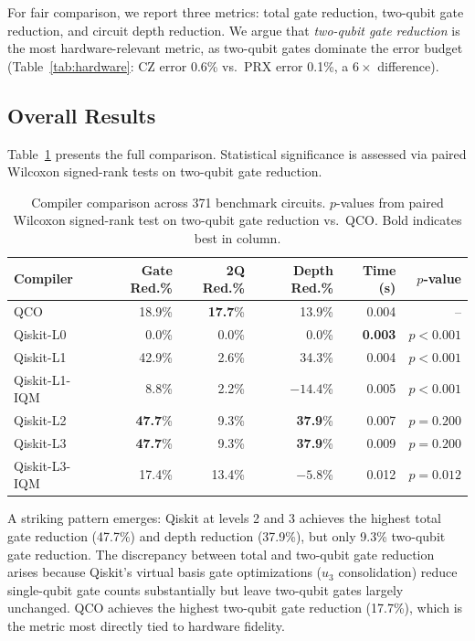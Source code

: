 \documentclass[sigconf,nonacm]{acmart}
\begin{document}
For fair comparison, we report three metrics: total gate reduction, two-qubit gate reduction, and circuit depth reduction. We argue that \emph{two-qubit gate reduction} is the most hardware-relevant metric, as two-qubit gates dominate the error budget (Table~\ref{tab:hardware}: CZ error 0.6\% vs.\ PRX error 0.1\%, a $6\times$ difference).

\subsection{Overall Results}

Table~\ref{tab:compiler} presents the full comparison. Statistical significance is assessed via paired Wilcoxon signed-rank tests on two-qubit gate reduction.

\begin{table}[t]
\centering
\caption{Compiler comparison across 371 benchmark circuits. $p$-values from paired Wilcoxon signed-rank test on two-qubit gate reduction vs.\ QCO. Bold indicates best in column.}
\label{tab:compiler}
\begin{tabular}{lrrrrr}
\toprule
\textbf{Compiler} & \textbf{Gate Red.\%} & \textbf{2Q Red.\%} & \textbf{Depth Red.\%} & \textbf{Time (s)} & \textbf{$p$-value} \\
\midrule
QCO & 18.9\% & \textbf{17.7}\% & 13.9\% & 0.004 & -- \\
Qiskit-L0 & 0.0\% & 0.0\% & 0.0\% & \textbf{0.003} & $p < 0.001$ \\
Qiskit-L1 & 42.9\% & 2.6\% & 34.3\% & 0.004 & $p < 0.001$ \\
Qiskit-L1-IQM & 8.8\% & 2.2\% & $-14.4$\% & 0.005 & $p < 0.001$ \\
Qiskit-L2 & \textbf{47.7}\% & 9.3\% & \textbf{37.9}\% & 0.007 & $p = 0.200$ \\
Qiskit-L3 & \textbf{47.7}\% & 9.3\% & \textbf{37.9}\% & 0.009 & $p = 0.200$ \\
Qiskit-L3-IQM & 17.4\% & 13.4\% & $-5.8$\% & 0.012 & $p = 0.012$ \\
\bottomrule
\end{tabular}
\end{table}

A striking pattern emerges: Qiskit at levels 2 and 3 achieves the highest total gate reduction (47.7\%) and depth reduction (37.9\%), but only 9.3\% two-qubit gate reduction. The discrepancy between total and two-qubit gate reduction arises because Qiskit's virtual basis gate optimizations ($u_3$ consolidation) reduce single-qubit gate counts substantially but leave two-qubit gates largely unchanged. QCO achieves the highest two-qubit gate reduction (17.7\%), which is the metric most directly tied to hardware fidelity.
\end{document}
